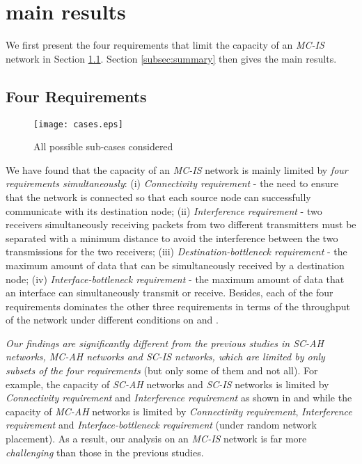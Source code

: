 \documentclass[10pt,journal]{IEEEtran}
\begin{document}
\section{main results}
\label{sec:main}
We first present the four requirements that limit the capacity of an \textit{MC-IS} network in Section \ref{subsec:fourR}. Section \ref{subsec:summary} then gives the main results.

\subsection{Four Requirements}
\label{subsec:fourR}

\begin{figure*}[t]
\centering
\texttt{[image: cases.eps]}
\caption{All possible sub-cases considered}
\label{fig:cases}
\end{figure*}

We have found that the capacity of an \textit{MC-IS} network is mainly limited by \emph{four requirements simultaneously}: (i) \textit{Connectivity requirement} - the need to ensure that the network is connected so that each source node can successfully communicate with its destination node; (ii) \textit{Interference requirement} - two receivers simultaneously receiving packets from two different transmitters must be separated with a minimum distance to avoid the interference between the two transmissions for the two receivers; (iii) \textit{Destination-bottleneck requirement} - the maximum amount of data that can be simultaneously received by a destination node; (iv) \textit{Interface-bottleneck requirement} - the maximum amount of data that an interface can simultaneously transmit or receive. Besides, each of the four requirements dominates the other three requirements in terms of the throughput of the network under different conditions on  and . 

\emph{Our findings are significantly different from the previous studies in {\it SC-AH} networks, {\it MC-AH} networks and {\it SC-IS} networks, which are limited by only subsets of the four requirements} (but only some of them and not all). For example, the capacity of {\it SC-AH} networks and {\it SC-IS} networks is limited by \textit{Connectivity requirement} and \textit{Interference requirement} as shown in \cite{Gupta:Kumar} and \cite{bliu:infocom2003} while the capacity of {\it MC-AH} networks is limited by \textit{Connectivity requirement}, \textit{Interference requirement} and \textit{Interface-bottleneck requirement} \cite{Kyasanur:mobicom2005} (under random network placement). As a result, our analysis on an \textit{MC-IS} network is far more \emph{challenging} than those in the previous studies.
\end{document}
